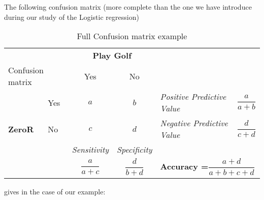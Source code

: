 	The following confusion matrix (more complete than the one we have introduce during our study of the Logistic regression)
	\begin{table}[H]
		\centering
		\begin{tabular}{|l|l|c|c|l|l|}
		\hline
		\multicolumn{2}{|l|}{\cellcolor[HTML]{FFFFFF}} & \multicolumn{2}{c|}{\cellcolor[HTML]{C0C0C0}\textbf{Play Golf}} & \multicolumn{2}{l|}{} \\ \cline{3-4}
		\multicolumn{2}{|l|}{\multirow{-2}{*}{\cellcolor[HTML]{FFFFFF}Confusion matrix}} & \cellcolor[HTML]{C0C0C0}Yes & \cellcolor[HTML]{C0C0C0}No & \multicolumn{2}{l|}{\multirow{-2}{*}{}} \\ \hline
		\cellcolor[HTML]{C0C0C0} & \cellcolor[HTML]{C0C0C0}Yes & $a$ & $b$ & \cellcolor[HTML]{FFFFC7}\textit{Positive Predictive Value} & \cellcolor[HTML]{FFFFC7}$\dfrac{a}{a+b}$ \\ \cline{2-6} 
		\multirow{-2}{*}{\cellcolor[HTML]{C0C0C0}\textbf{ZeroR}} & \cellcolor[HTML]{C0C0C0}No & $c$ & $d$ & \cellcolor[HTML]{FFFFC7}\textit{Negative Predictive Value} & \cellcolor[HTML]{FFFFC7}$\dfrac{d}{c+d}$ \\ \hline
		\multicolumn{2}{|l|}{} & \cellcolor[HTML]{FFFFC7}\textit{Sensitivity} & \cellcolor[HTML]{FFFFC7}\textit{Specificity} & \multicolumn{2}{l|}{} \\ \cline{3-4}
		\multicolumn{2}{|l|}{\multirow{-2}{*}{}} & \cellcolor[HTML]{FFFFC7}$\dfrac{a}{a+c}$ & \cellcolor[HTML]{FFFFC7}$\dfrac{d}{b+d}$ & \multicolumn{2}{l|}{\multirow{-2}{*}{\textbf{Accuracy =}$\dfrac{a+d}{a+b+c+d}$}} \\ \hline
		\end{tabular}
		\caption{Full Confusion matrix example}
	\end{table}
	gives in the case of our example:
